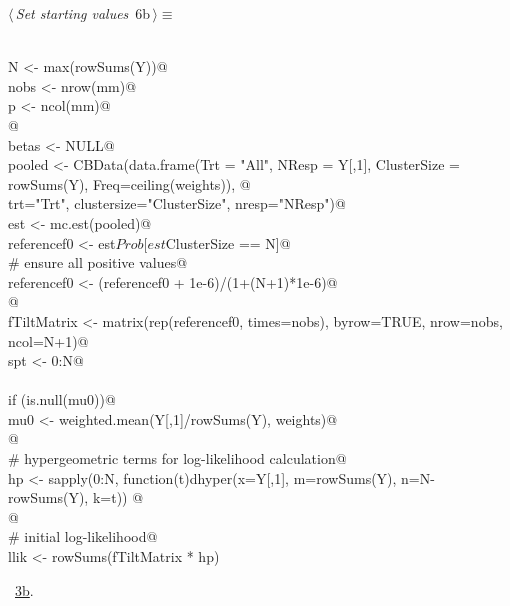 \documentclass[reqno]{amsart}
\renewcommand{\NWtarget}[2]{\hypertarget{#1}{#2}}
\renewcommand{\NWlink}[2]{\hyperlink{#1}{#2}}
\begin{document}
\begin{flushleft} \small\label{scrap8}\raggedright\small
\NWtarget{nuweb6b}{} $\langle\,${\itshape Set starting values}\nobreak\ {\footnotesize {6b}}$\,\rangle\equiv$
\vspace{-1ex}
\begin{list}{}{} \item
\mbox{}\verb@@\\
\mbox{}\verb@  N <- max(rowSums(Y))@\\
\mbox{}\verb@  nobs <- nrow(mm)@\\
\mbox{}\verb@  p <- ncol(mm)@\\
\mbox{}\verb@  @\\
\mbox{}\verb@  betas <- NULL@\\
\mbox{}\verb@  pooled <- CBData(data.frame(Trt = "All", NResp = Y[,1], ClusterSize = rowSums(Y), Freq=ceiling(weights)), @\\
\mbox{}\verb@                    trt="Trt", clustersize="ClusterSize", nresp="NResp")@\\
\mbox{}\verb@  est <- mc.est(pooled)@\\
\mbox{}\verb@  referencef0 <- est$Prob[est$ClusterSize == N]@\\
\mbox{}\verb@  # ensure all positive values@\\
\mbox{}\verb@  referencef0 <- (referencef0 + 1e-6)/(1+(N+1)*1e-6)@\\
\mbox{}\verb@  @\\
\mbox{}\verb@  fTiltMatrix <- matrix(rep(referencef0, times=nobs), byrow=TRUE, nrow=nobs, ncol=N+1)@\\
\mbox{}\verb@  spt <- 0:N@\\
\mbox{}\verb@@\\
\mbox{}\verb@  if (is.null(mu0))@\\
\mbox{}\verb@    mu0 <- weighted.mean(Y[,1]/rowSums(Y), weights)@\\
\mbox{}\verb@  @\\
\mbox{}\verb@  # hypergeometric terms for log-likelihood calculation@\\
\mbox{}\verb@  hp <- sapply(0:N, function(t)dhyper(x=Y[,1], m=rowSums(Y), n=N-rowSums(Y), k=t))   @\\
\mbox{}\verb@  @\\
\mbox{}\verb@  # initial log-likelihood@\\
\mbox{}\verb@  llik <- rowSums(fTiltMatrix * hp) %*% weights@\\
\mbox{}\verb@@\\
\mbox{}\verb@@{\NWsep}
\end{list}
\vspace{-1.5ex}
\footnotesize
\begin{list}{}{\setlength{\itemsep}{-\parsep}\setlength{\itemindent}{-\leftmargin}}
\item \NWtxtMacroRefIn\ \NWlink{nuweb3b}{3b}.

\item{}
\end{list}
\vspace{4ex}
\end{flushleft}
\end{document}
